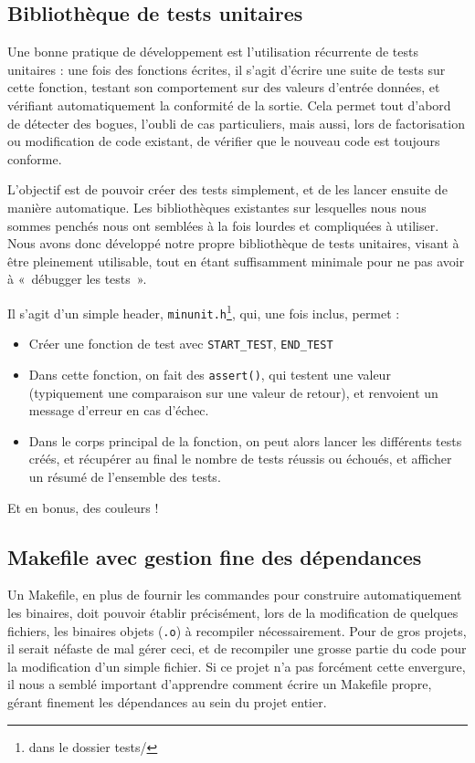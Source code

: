 \documentclass[a4paper]{article}
\begin{document}
\subsection{Bibliothèque de tests unitaires}
Une bonne pratique de développement est l'utilisation récurrente de tests unitaires : une fois des fonctions écrites, il s'agit d'écrire une suite de tests sur cette fonction, testant son comportement sur des valeurs d'entrée données, et vérifiant automatiquement la conformité de la sortie. Cela permet tout d'abord de détecter des bogues, l'oubli de cas particuliers, mais aussi, lors de factorisation ou modification de code existant, de vérifier que le nouveau code est toujours conforme.

L'objectif est de pouvoir créer des tests simplement, et de les lancer ensuite de manière automatique. Les bibliothèques existantes sur lesquelles nous nous sommes penchés nous ont semblées à la fois lourdes et compliquées à utiliser. Nous avons donc développé notre propre bibliothèque de tests unitaires, visant à être pleinement utilisable, tout en étant suffisamment minimale pour ne pas avoir à «~débugger les tests~».

Il s'agit d'un simple header, \texttt{minunit.h}\footnote{dans le dossier tests/}, qui, une fois inclus, permet :
\begin{itemize}
\item Créer une fonction de test avec \texttt{START\_TEST}, \texttt{END\_TEST}
\item Dans cette fonction, on fait des \texttt{assert()}, qui testent une valeur (typiquement une comparaison sur une valeur de retour), et renvoient un message d'erreur en cas d'échec.
\item Dans le corps principal de la fonction, on peut alors lancer les différents tests créés, et récupérer au final le nombre de tests réussis ou échoués, et afficher un résumé de l'ensemble des tests.
\end{itemize}

Et en bonus, des couleurs !

\subsection{Makefile avec gestion fine des dépendances}
Un Makefile, en plus de fournir les commandes pour construire automatiquement les binaires, doit pouvoir établir précisément, lors de la modification de quelques fichiers, les binaires objets (\texttt{.o}) à recompiler nécessairement. Pour de gros projets, il serait néfaste de mal gérer ceci, et de recompiler une grosse partie du code pour la modification d'un simple fichier. Si ce projet n'a pas forcément cette envergure, il nous a semblé important d'apprendre comment écrire un Makefile propre, gérant finement les dépendances au sein du projet entier. 
\end{document}

